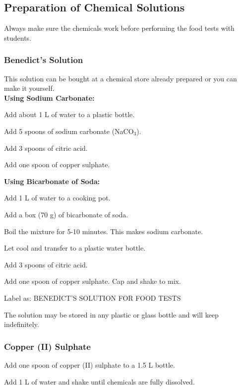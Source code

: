 \subsection{Preparation of Chemical Solutions}
Always make sure the chemicals work before performing the food tests with students.

\subsubsection{Benedict's Solution}
This solution can be bought at a chemical store already prepared or you can make it yourself.\\

\textbf{Using Sodium Carbonate:}
\begin{itemize*}
\item Add about 1 L of water to a plastic bottle.
\item Add 5 spoons of sodium carbonate (NaCO$_3$).
\item Add 3 spoons of citric acid.
\item Add one spoon of copper sulphate.
\end{itemize*}

\textbf{Using Bicarbonate of Soda:}
\begin{itemize*}
\item Add 1 L of water to a cooking pot.
\item Add a box (70 g) of bicarbonate of soda.
\item Boil the mixture for 5-10 minutes. This makes sodium carbonate.
\item Let cool and transfer to a plastic water bottle.
\item Add 3 spoons of citric acid.
\item Add one spoon of copper sulphate. Cap and shake to mix.
\end{itemize*}

\noindent Label as: BENEDICT'S SOLUTION FOR FOOD TESTS

\noindent The solution may be stored in any plastic or glass bottle and will keep indefinitely.

\subsubsection{Copper (II) Sulphate}
\begin{itemize*}
\item Add one spoon of copper (II) sulphate to a 1.5 L bottle.
\item Add 1 L of water and shake until chemicals are fully dissolved.
\end{itemize*}

